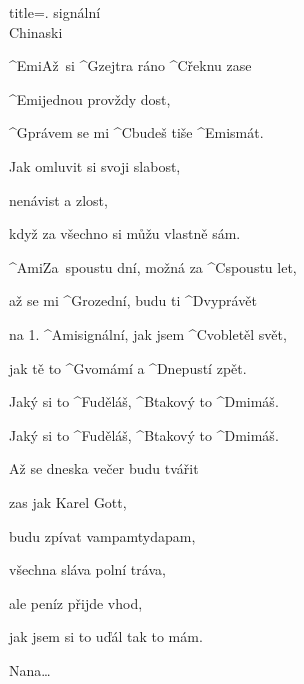 \begin{song}{title=\predtitle {}. signální \\\large Chinaski  \vspace*{-0.3cm}}  %
\begin{centerjustified}
\nejnejvetsi
\sloka 
	^{Emi\z }Až~si ^{G\z }zejtra ráno ^{C}řeknu zase 

	^{Emi}jednou provždy dost,

	^{G\z }právem se mi ^{C\z }budeš tiše ^{Emi}smát.

	Jak omluvit si svoji slabost,

	nenávist a zlost,

	když za všechno si můžu vlastně sám. 

	^{Ami\z}Za~spoustu dní, možná za ^{C\z }spoustu let, 

	až se mi ^{G\z }rozední, budu ti ^{D\z }vyprávět 

	na 1. ^{Ami\z }signální, jak jsem ^{C\z }vobletěl svět, 

	jak tě to ^{G\z }vomámí a ^{D\z }nepustí zpět.

	Jaký si to ^{F\z }uděláš, ^{B\z }takový to ^{Dmi}máš. 

	Jaký si to ^{F\z }uděláš, ^{B\z }takový to ^{Dmi}máš. 

\sloka
	Až se dneska večer budu tvářit
	
	zas jak Karel Gott, 
	
	budu zpívat vampamtydapam,
	
	všechna sláva polní tráva,
	
	ale peníz přijde vhod,
	
	jak jsem si to uďál tak to mám.


\sloka Nana\elipsa\dots

\end{centerjustified}
\setcounter{Slokočet}{0}
\end{song}
